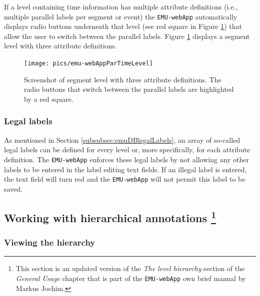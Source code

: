 \documentclass[]{book}
\begin{document}
If a level containing time information has multiple attribute definitions (i.e., multiple parallel labels per segment or event) the \texttt{EMU-webApp} automatically displays radio buttons underneath that level (see red square in Figure \ref{fig:webApp-parTimeLevel}) that allow the user to switch between the parallel labels. Figure \ref{fig:webApp-parTimeLevel} displays a segment level with three attribute definitions.

\begin{figure}

{\centering \texttt{[image: pics/emu-webAppParTimeLevel]} 

}

\caption{Screenshot of segment level with three attribute definitions. The radio buttons that switch between the parallel labels are highlighted by a red square.}\label{fig:webApp-parTimeLevel}
\end{figure}

\hypertarget{legal-labels}{%
\subsubsection*{Legal labels}\label{legal-labels}}

As mentioned in Section \ref{subsubsec:emuDBlegalLabels}, an array of so-called legal labels can be defined for every level or, more specifically, for each attribute definition. The \texttt{EMU-webApp} enforces these legal labels by not allowing any other labels to be entered in the label editing text fields. If an illegal label is entered, the text field will turn red and the \texttt{EMU-webApp} will not permit this label to be saved.

\hypertarget{working-with-hierarchical-annotations-2-chapemu-webapp}{%
\subsection[Working with hierarchical annotations ]{\texorpdfstring{Working with hierarchical annotations \footnote{This section is an updated version of the \emph{The level hierarchy} section of the \emph{General Usage} chapter that is part of the \texttt{EMU-webApp} own brief manual by Markus Jochim.}}{Working with hierarchical annotations }}\label{working-with-hierarchical-annotations-2-chapemu-webapp}}

\hypertarget{viewing-the-hierarchy}{%
\subsubsection*{Viewing the hierarchy}\label{viewing-the-hierarchy}}
\end{document}
